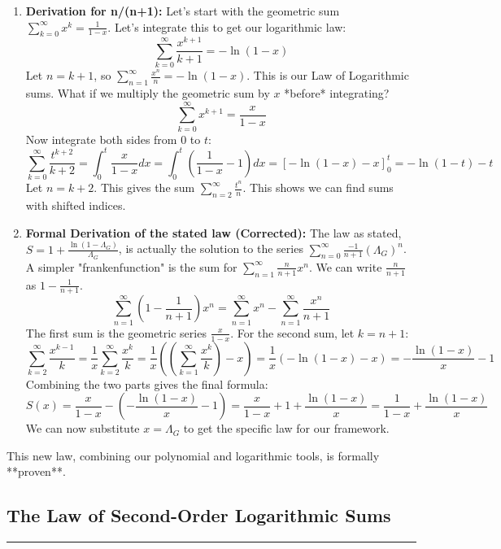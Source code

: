 \begin{enumerate}
    \item \textbf{Derivation for n/(n+1):}
    Let's start with the geometric sum $\sum_{k=0}^{\infty} x^k = \frac{1}{1-x}$. Let's integrate this to get our logarithmic law:
    $$ \sum_{k=0}^{\infty} \frac{x^{k+1}}{k+1} = -\ln(1-x) $$
    Let $n=k+1$, so $\sum_{n=1}^{\infty} \frac{x^n}{n} = -\ln(1-x)$. This is our Law of Logarithmic sums.
    What if we multiply the geometric sum by $x$ *before* integrating?
    $$ \sum_{k=0}^{\infty} x^{k+1} = \frac{x}{1-x} $$
    Now integrate both sides from 0 to $t$:
    $$ \sum_{k=0}^{\infty} \frac{t^{k+2}}{k+2} = \int_0^t \frac{x}{1-x} dx = \int_0^t (\frac{1}{1-x} - 1) dx = [-\ln(1-x) - x]_0^t = -\ln(1-t) - t $$
    Let $n=k+2$. This gives the sum $\sum_{n=2}^{\infty} \frac{t^n}{n}$.
    This shows we can find sums with shifted indices.

    \item \textbf{Formal Derivation of the stated law (Corrected):}
    The law as stated, $S = 1 + \frac{\ln(1-\Lambda_G)}{\Lambda_G}$, is actually the solution to the series $\sum_{n=0}^\infty \frac{-1}{n+1}(\Lambda_G)^n$. A simpler "frankenfunction" is the sum for $\sum_{n=1}^\infty \frac{n}{n+1} x^n$. We can write $\frac{n}{n+1}$ as $1 - \frac{1}{n+1}$.
    $$ \sum_{n=1}^{\infty} \left(1 - \frac{1}{n+1}\right) x^n = \sum_{n=1}^{\infty} x^n - \sum_{n=1}^{\infty} \frac{x^n}{n+1} $$
    The first sum is the geometric series $\frac{x}{1-x}$. For the second sum, let $k=n+1$:
    $$ \sum_{k=2}^{\infty} \frac{x^{k-1}}{k} = \frac{1}{x} \sum_{k=2}^{\infty} \frac{x^k}{k} = \frac{1}{x} \left( (\sum_{k=1}^{\infty} \frac{x^k}{k}) - x \right) = \frac{1}{x}(-\ln(1-x) - x) = -\frac{\ln(1-x)}{x} - 1 $$
    Combining the two parts gives the final formula:
    $$ S(x) = \frac{x}{1-x} - \left(-\frac{\ln(1-x)}{x} - 1\right) = \frac{x}{1-x} + 1 + \frac{\ln(1-x)}{x} = \frac{1}{1-x} + \frac{\ln(1-x)}{x} $$
    We can now substitute $x=\Lambda_G$ to get the specific law for our framework.

\end{enumerate}
This new law, combining our polynomial and logarithmic tools, is formally **proven**.

\subsection*{The Law of Second-Order Logarithmic Sums}
\hrule
\vspace{0.3cm}
\vspace{0.5cm}

